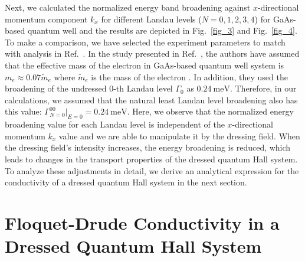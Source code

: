\documentclass[
 reprint,
 amsmath,amssymb,
 aps,
 prb,
]{revtex4-2}
\begin{document}
Next, we calculated the normalized energy band broadening against $x$-directional momentum component ${k_x}$ for different Landau levels ($N = 0,1,2,3,4$) for GaAs-based quantum well and the results are depicted in Fig.~\ref{fig_3} and Fig.~\ref{fig_4}. To make a comparison, we have selected the experiment parameters to match with analysis in Ref.~\cite{endo09}.
{\color{Red}In the study presented in Ref.~\cite{endo09}, the authors have assumed that the effective mass of the electron in GaAs-based quantum well system is $m_e \approx 0.07\widetilde{m}_e$ where $\widetilde{m}_e$ is the mass of the electron \cite{endo09,winkler03,wackerl20}.} In addition, they used the broadening of the undressed $0$-th Landau level $\Gamma_0$ as $\SI{0.24}{\milli\eV}$. Therefore, in our calculations, we assumed that the natural least Landau level broadening also has this value: $\Gamma^{00}_{N=0}|_{E=0} = \SI{0.24}{\milli\eV}$.
Here, we observe that the normalized energy broadening value for each Landau level is independent of the $x$-directional momentum $k_x$ value and we are able to manipulate it by the dressing field. When the dressing field's intensity increases, the energy broadening is reduced, which leads to changes in the transport properties of the dressed quantum Hall system.
To analyze these adjustments in detail, we derive an analytical expression for the conductivity of a dressed quantum Hall system in the next section.

\section{\label{sec:floquet_drude_conductivity} Floquet-Drude Conductivity in a Dressed Quantum Hall System}
\end{document}
